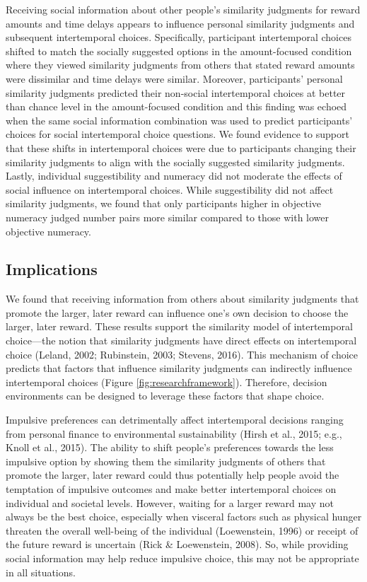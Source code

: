 \documentclass[
  pub,floatsintext]{apa6}
\begin{document}
Receiving social information about other people's similarity judgments for reward amounts and time delays appears to influence personal similarity judgments and subsequent intertemporal choices. Specifically, participant intertemporal choices shifted to match the socially suggested options in the amount-focused condition where they viewed similarity judgments from others that stated reward amounts were dissimilar and time delays were similar. Moreover, participants' personal similarity judgments predicted their non-social intertemporal choices at better than chance level in the amount-focused condition and this finding was echoed when the same social information combination was used to predict participants' choices for social intertemporal choice questions. We found evidence to support that these shifts in intertemporal choices were due to participants changing their similarity judgments to align with the socially suggested similarity judgments. Lastly, individual suggestibility and numeracy did not moderate the effects of social influence on intertemporal choices. While suggestibility did not affect similarity judgments, we found that only participants higher in objective numeracy judged number pairs more similar compared to those with lower objective numeracy.

\hypertarget{implications}{%
\subsection{Implications}\label{implications}}

We found that receiving information from others about similarity judgments that promote the larger, later reward can influence one's own decision to choose the larger, later reward. These results support the similarity model of intertemporal choice---the notion that similarity judgments have direct effects on intertemporal choice (Leland, 2002; Rubinstein, 2003; Stevens, 2016). This mechanism of choice predicts that factors that influence similarity judgments can indirectly influence intertemporal choices (Figure \ref{fig:researchframework}). Therefore, decision environments can be designed to leverage these factors that shape choice.

Impulsive preferences can detrimentally affect intertemporal decisions ranging from personal finance to environmental sustainability (Hirsh et al., 2015; e.g., Knoll et al., 2015). The ability to shift people's preferences towards the less impulsive option by showing them the similarity judgments of others that promote the larger, later reward could thus potentially help people avoid the temptation of impulsive outcomes and make better intertemporal choices on individual and societal levels. However, waiting for a larger reward may not always be the best choice, especially when visceral factors such as physical hunger threaten the overall well-being of the individual (Loewenstein, 1996) or receipt of the future reward is uncertain (Rick \& Loewenstein, 2008). So, while providing social information may help reduce impulsive choice, this may not be appropriate in all situations.
\end{document}
